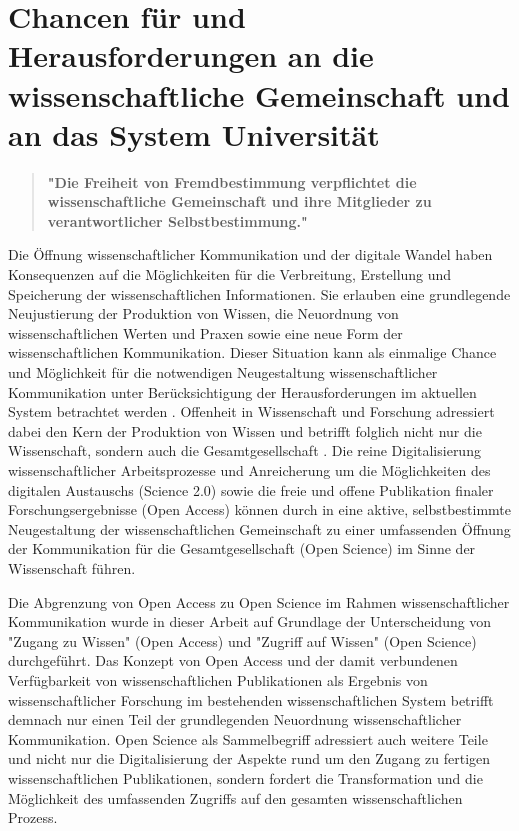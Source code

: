 \section{Chancen für und Herausforderungen an die wissenschaftliche Gemeinschaft und an das System Universität}

\begin{quote}
\textbf{"Die Freiheit von Fremdbestimmung verpflichtet die wissenschaftliche Gemeinschaft und ihre Mitglieder zu verantwortlicher Selbstbestimmung."}
\end{quote} \cite{Oezmen_2015}

Die Öffnung wissenschaftlicher Kommunikation und der digitale Wandel haben Konsequenzen auf die Möglichkeiten für die Verbreitung, Erstellung und Speicherung der wissenschaftlichen Informationen. Sie erlauben eine grundlegende Neujustierung der Produktion von Wissen, die Neuordnung von wissenschaftlichen Werten und Praxen sowie eine neue Form der wissenschaftlichen Kommunikation. Dieser Situation kann als einmalige Chance und Möglichkeit für die notwendigen Neugestaltung wissenschaftlicher Kommunikation unter Berücksichtigung der Herausforderungen im aktuellen System betrachtet werden \cite{naeder_2010_open}. Offenheit in Wissenschaft und Forschung adressiert dabei den Kern der Produktion von Wissen und betrifft folglich nicht nur die Wissenschaft, sondern auch die Gesamtgesellschaft \cite{Mussell_2013}. Die reine Digitalisierung wissenschaftlicher Arbeitsprozesse und Anreicherung um die Möglichkeiten des digitalen Austauschs (Science 2.0) sowie die freie und offene Publikation finaler Forschungsergebnisse (Open Access) können durch in eine aktive, selbstbestimmte Neugestaltung der wissenschaftlichen Gemeinschaft zu einer umfassenden Öffnung der Kommunikation für die Gesamtgesellschaft (Open Science) im Sinne der Wissenschaft führen.

Die Abgrenzung von Open Access zu Open Science im Rahmen wissenschaftlicher Kommunikation wurde in dieser Arbeit auf Grundlage der Unterscheidung von "Zugang zu Wissen" (Open Access) und "Zugriff auf Wissen" (Open Science) durchgeführt. Das Konzept von Open Access und der damit verbundenen Verfügbarkeit von wissenschaftlichen Publikationen als Ergebnis von wissenschaftlicher Forschung im bestehenden wissenschaftlichen System betrifft demnach nur einen Teil der grundlegenden Neuordnung wissenschaftlicher Kommunikation. Open Science als Sammelbegriff adressiert auch weitere Teile und nicht nur die Digitalisierung der Aspekte rund um den Zugang zu fertigen wissenschaftlichen Publikationen, sondern fordert die Transformation und die Möglichkeit des umfassenden Zugriffs auf den gesamten wissenschaftlichen Prozess.


